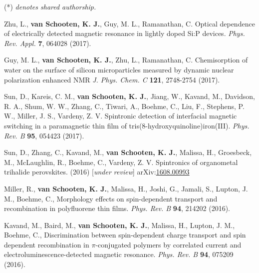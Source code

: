 \documentclass[11pt,letterpaper]{article}
\newcommand{\mhead}[1]{\leavevmode\marginpar{\sffamily\small #1}}
\begin{document}
\mhead{Refereed\newline Journal\newline Publications}
\vspace{-1.1em} %
(*) \textit{denotes shared authorship.}
\begin{bibenum}
	\bigskip

	\item Zhu, L., \textbf{van Schooten, K. J.}, Guy, M. L., Ramanathan, C. Optical dependence of electrically detected magnetic resonance in lightly doped Si:P devices. \textit{Phys. Rev. Appl.} \textbf{7}, 064028 (2017). 

	\item Guy, M. L., \textbf{van Schooten, K. J.}, Zhu, L., Ramanathan, C. Chemisorption of water on the surface of silicon microparticles measured by dynamic nuclear polarization enhanced NMR \textit{J. Phys. Chem. C} \textbf{121}, 2748-2754 (2017). 

	\item Sun, D., Kareis, C. M., \textbf{van Schooten, K. J.}, Jiang, W., Kavand, M., Davidson, R. A., Shum, W. W., Zhang, C., Tiwari, A., Boehme, C., Liu, F., Stephens, P. W., Miller, J. S., Vardeny, Z. V. Spintronic detection of interfacial magnetic switching in a paramagnetic thin film of tris(8-hydroxyquinoline)iron(III). \textit{Phys. Rev. B} \textbf{95}, 054423 (2017). 

	\item Sun, D., Zhang, C., Kavand, M., \textbf{van Schooten, K. J.}, Malissa, H., Groesbeck, M., McLaughlin, R., Boehme, C., Vardeny, Z. V. Spintronics of organometal trihalide perovskites. (2016) [\textit{under review}] arXiv:\href{http://arxiv.org/abs/1608.00993}{1608.00993}

	\item Miller, R., \textbf{van Schooten, K. J.}, Malissa, H., Joshi, G., Jamali, S., Lupton, J. M., Boehme, C., Morphology effects on spin-dependent transport and recombination in polyfluorene thin films. \textit{Phys. Rev. B} \textbf{94}, 214202 (2016). 

	\item Kavand, M., Baird, M., \textbf{van Schooten, K. J.}, Malissa, H., Lupton, J. M., Boehme, C., Discrimination between spin-dependent charge transport and spin dependent recombination in $\pi$-conjugated polymers by correlated current and electroluminescence-detected magnetic resonance. \textit{Phys. Rev. B} \textbf{94}, 075209 (2016). 


\end{bibenum}
\end{document}
